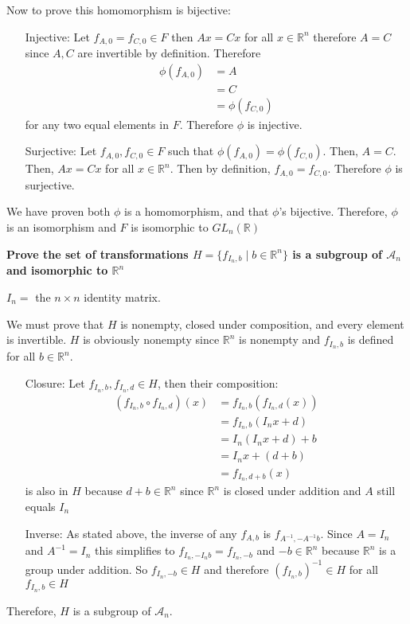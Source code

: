 \documentclass[12pt,letterpaper]{article}
\begin{document}
\begin{enumerate}
    Now to prove this homomorphism is bijective:
    \begin{itemize}
        \item [Injective:] Let $f_{A,0}=f_{C,0}\in F$ then $Ax=Cx$ for all $x\in \mathbb{R}^n$ therefore $A=C$ since $A,C$ are invertible by definition. Therefore 
        \begin{align*}
            \phi(f_{A,0}) &= A\\
            &= C\\
            &= \phi(f_{C,0})
        \end{align*}
        for any two equal elements in $F$. Therefore $\phi$ is injective.
        
        \item [Surjective:] Let $f_{A,0},f_{C,0}\in F$ such that $\phi(f_{A,0})=\phi(f_{C,0})$. Then, $A=C$. Then, $Ax=Cx$ for all $x\in \mathbb{R}^n$. Then by definition, $f_{A,0}=f_{C,0}$. Therefore $\phi$ is surjective.
    \end{itemize}
    
    We have proven both $\phi$ is a homomorphism, and that $\phi$'s bijective. Therefore, $\phi$ is an isomorphism and $F$ is isomorphic to $GL_n(\mathbb{R})$ \cite{Algebra}
    
    \textbf{Prove the set of transformations $H = \{f_{I_n,b} \mid b\in \mathbb{R}^n\}$ is a subgroup of $\mathcal{A}_n$ and isomorphic to $\mathbb{R}^n$}
    
    $I_n = $ the $n\times n$ identity matrix.
    
    We must prove that $H$ is nonempty, closed under composition, and every element is invertible. $H$ is obviously nonempty since $\mathbb{R}^n$ is nonempty and $f_{I_n,b}$ is defined for all $b\in \mathbb{R}^n$. 
    \begin{itemize}
        \item [Closure:] Let $f_{I_n,b},f_{I_n,d}\in H$, then their composition:
        \begin{align*}
            (f_{I_n,b}\circ f_{I_n,d})(x) &= f_{I_n,b}(f_{I_n,d}(x))\\
            &= f_{I_n,b}(I_nx+d)\\
            &= I_n(I_nx+d)+b\\
            &= I_nx + (d+b)\\
            &= f_{I_n,d+b}(x)
        \end{align*}
        is also in $H$ because $d+b\in \mathbb{R}^n$ since $\mathbb{R}^n$ is closed under addition and $A$ still equals $I_n$
        \item [Inverse:] As stated above, the inverse of any $f_{A,b}$ is $f_{A^{-1},-A^{-1}b}$. Since $A=I_n$ and $A^{-1}=I_n$ this simplifies to $f_{I_n,-I_nb}=f_{I_n,-b}$ and $-b\in\mathbb{R}^n$ because $\mathbb{R}^n$ is a group under addition. So $f_{I_n,-b}\in H$ and therefore $(f_{I_n,b})^{-1}\in H$ for all $f_{I_n,b}\in H$
    \end{itemize}
    Therefore, $H$ is a subgroup of $\mathcal{A}_n$.
    

\end{enumerate}
\end{document}
